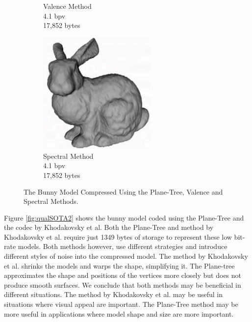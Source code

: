 \begin{figure}[H]
\begin{center}
\begin{subfigure}[b]{6cm}
                \captionsetup{justification=centering}
                \caption{Valence Method \cite{touma98triangle}\\4.1 bpv\\17,852 bytes}
                \label{fig:PT_SOTAQ1_TG}
        \end{subfigure}%
        \begin{subfigure}[b]{6cm}
                \includegraphics[width=5.8cm]{images/experiments/pt_qual/kg}
                \captionsetup{justification=centering}
                \caption{Spectral Method \cite{Karni00Spectral}\\4.1 bpv\\17,852 bytes}
                \label{fig:PT_SOTAQ1_KG}
        \end{subfigure}
       \caption{The Bunny Model Compressed Using the Plane-Tree, Valence and Spectral Methods.}
       \label{fig:qualSOTA1}
       \end{center}
\end{figure}

Figure \ref{fig:qualSOTA2} shows the bunny model coded using the Plane-Tree and the codec by Khodakovsky et al. Both the Plane-Tree and method by Khodakovsky et al. require just 1349 bytes of storage to represent these low bit-rate models. Both methods however, use different strategies and introduce different styles of noise into the compressed model. The method by Khodakovsky et al. shrinks the models and warps the shape, simplifying it. The Plane-tree approximates the shape and positions of the vertices more closely but does not produce smooth surfaces. We conclude that both methods may be beneficial in different situations. The method by Khodakovsky et al. may be useful in situations where visual appeal are important. The Plane-Tree method may be more useful in applications where model shape and size are more important. \\

